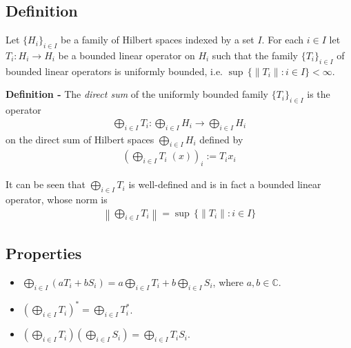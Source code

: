 \documentclass[12pt]{article}
\begin{document}

\subsection{Definition}
Let $\{ H_i\}_{i \in I}$ be a family of Hilbert spaces indexed by a set $I$. For each $i \in I$ let $T_i:H_i \longrightarrow H_i$ be a bounded linear operator on $H_i$ such that the family $\{T_i\}_{i \in I}$ of bounded linear operators is uniformly bounded, i.e. $\sup\,\{\|T_i\|: i \in I\} < \infty$.

{\bf Definition -} The \emph{direct sum} of the uniformly bounded family $\{T_i\}_{i \in I}$ is the operator
\begin{align*}
\bigoplus_{i \in I} T_i : \bigoplus_{i \in I} H_i \longrightarrow \bigoplus_{i \in I} H_i
\end{align*}
on the direct sum of Hilbert spaces $\bigoplus_{i \in I} H_i$ defined by
\begin{align*}
\left( \bigoplus_{i \in I} T_i \;(x)\right)_i := T_i x_i
\end{align*}

It can be seen that $\bigoplus_{i \in I} T_i$ is well-defined and is in fact a bounded linear operator, whose norm is
\begin{align*}
\left\|\bigoplus_{i \in I} T_i \right\| = \sup\,\{\|T_i\| : i \in I\}
\end{align*}

\subsection{Properties}
\begin{itemize}
\item $\displaystyle \bigoplus_{i \in I}  (aT_i + b S_i) = a \bigoplus_{i \in I} T_i + b\bigoplus_{i \in I} S_i$, where $a, b \in \mathbb{C}$.
\end{itemize}
\begin{itemize}
\item $\displaystyle \left(\bigoplus_{i \in I} T_i\right)^* = \bigoplus_{i \in I} T_i^*$.
\end{itemize}
\begin{itemize}
\item $\displaystyle \left(\bigoplus_{i \in I} T_i\right) \left(\bigoplus_{i \in I} S_i\right)  = \bigoplus_{i \in I} T_iS_i$.
\end{itemize}
\end{document}
